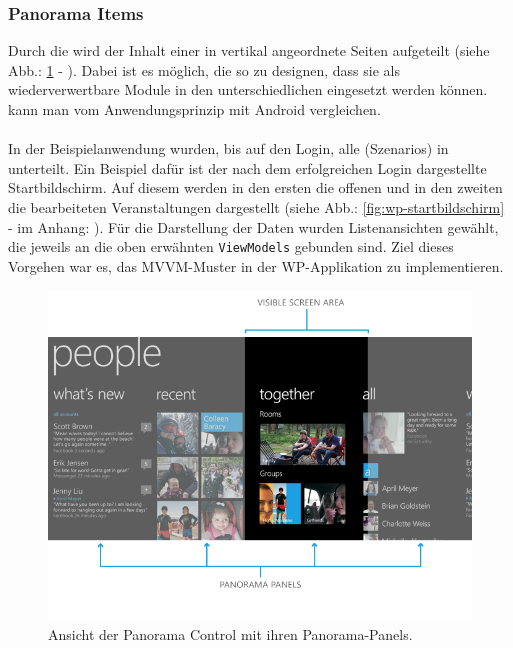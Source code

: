 \documentclass[Bachelorarbeit.tex]{subfiles}
\begin{document}
\subsubsection*{Panorama Items}
\label{subsubsec:panorama-items}
Durch die  wird der Inhalt einer  in vertikal angeordnete Seiten aufgeteilt (siehe Abb.: \ref{fig:panorama-control} - ). 
Dabei ist es möglich, die  so zu designen, dass sie als wiederverwertbare Module in den unterschiedlichen  eingesetzt werden können.  
 kann man vom Anwendungsprinzip  mit Android  vergleichen. \\
\\
In der Beispielanwendung wurden, bis auf den Login, alle  (Szenarios) in  unterteilt. 
Ein Beispiel dafür ist der nach dem erfolgreichen Login dargestellte Startbildschirm. 
Auf diesem werden in den ersten  die offenen und in den zweiten  die bearbeiteten Veranstaltungen dargestellt (siehe Abb.: \ref{fig:wp-startbildschirm} -  im Anhang: ).
Für die Darstellung der Daten wurden Listenansichten gewählt, die jeweils an die oben erwähnten \texttt{ViewModels} gebunden sind.
Ziel dieses Vorgehen war es, das \ac{MVVM}-Muster in der \ac{WP}-Applikation zu implementieren.


\begin{figure}[h]
\centering
\includegraphics[width=0.7\linewidth]{./img/panorama-controll}
\caption[Panorama Controll]{Ansicht der Panorama Control mit ihren Panorama-Panels. \parencite[Quelle:][]{wp8_PanoramaControl}}
\label{fig:panorama-control}
\end{figure}
\end{document}
